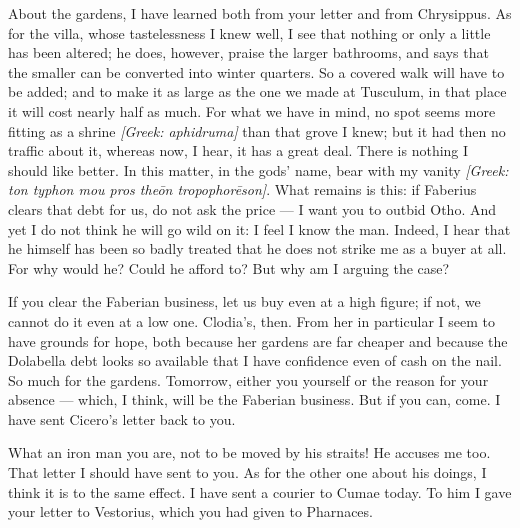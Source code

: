 

 About the gardens, I have learned both from your letter and from Chrysippus. As for the villa, whose tastelessness I knew well, I see that nothing or only a little has been altered; he does, however, praise the larger bathrooms, and says that the smaller can be converted into winter quarters. So a covered walk will have to be added; and to make it as large as the one we made at Tusculum, in that place it will cost nearly half as much. For what we have in mind, no spot seems more fitting as a shrine \textit{[Greek: aphidruma]} than that grove I knew; but it had then no traffic about it, whereas now, I hear, it has a great deal. There is nothing I should like better. In this matter, in the gods' name, bear with my vanity \textit{[Greek: ton typhon mou pros theōn tropophorēson]}. What remains is this: if Faberius clears that debt for us, do not ask the price --- I want you to outbid Otho. And yet I do not think he will go wild on it: I feel I know the man. Indeed, I hear that he himself has been so badly treated that he does not strike me as a buyer at all. For why would he? Could he afford to? But why am I arguing the case?

 If you clear the Faberian business, let us buy even at a high figure; if not, we cannot do it even at a low one. Clodia's, then. From her in particular I seem to have grounds for hope, both because her gardens are far cheaper and because the Dolabella debt looks so available that I have confidence even of cash on the nail. So much for the gardens. Tomorrow, either you yourself or the reason for your absence --- which, I think, will be the Faberian business. But if you can, come. I have sent Cicero's letter back to you.

 What an iron man you are, not to be moved by his straits! He accuses me too. That letter I should have \dag{}sent\dag{} to you. As for the other one about his doings, I think it is to the same effect. I have sent a courier to Cumae today. To him I gave your letter to Vestorius, which you had given to Pharnaces.

